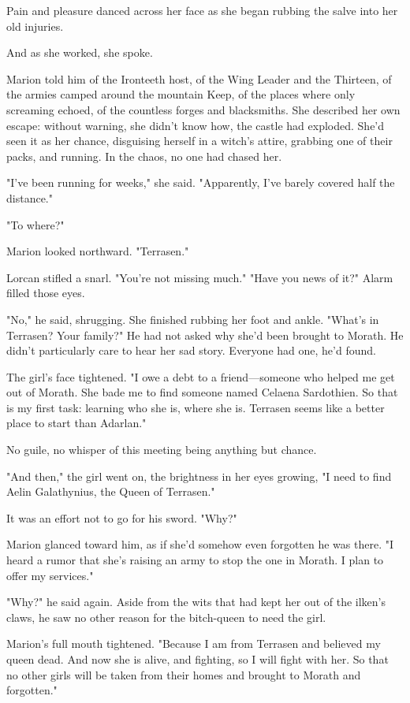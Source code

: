 Pain and pleasure danced across her face as she began rubbing the salve into her old injuries.

And as she worked, she spoke.

Marion told him of the Ironteeth host, of the Wing Leader and the Thirteen, of the armies camped around the mountain Keep, of the places where only screaming echoed, of the countless forges and blacksmiths. She described her own escape: without warning, she didn't know how, the castle had exploded. She'd seen it as her chance, disguising herself in a witch's attire, grabbing one of their packs, and running. In the chaos, no one had chased her.

"I've been running for weeks," she said. "Apparently, I've barely covered half the distance."

"To where?"

Marion looked northward. "Terrasen."

Lorcan stifled a snarl. "You're not missing much." "Have you news of it?" Alarm filled those eyes.

"No," he said, shrugging. She finished rubbing her foot and ankle. "What's in Terrasen? Your family?" He had not asked why she'd been brought to Morath. He didn't particularly care to hear her sad story. Everyone had one, he'd found.

The girl's face tightened. "I owe a debt to a friend---someone who helped me get out of Morath. She bade me to find someone named Celaena Sardothien. So that is my first task: learning who she is, where she is. Terrasen seems like a better place to start than Adarlan."

No guile, no whisper of this meeting being anything but chance.

"And then," the girl went on, the brightness in her eyes growing, "I need to find Aelin Galathynius, the Queen of Terrasen."

It was an effort not to go for his sword. "Why?"

Marion glanced toward him, as if she'd somehow even forgotten he was there. "I heard a rumor that she's raising an army to stop the one in Morath. I plan to offer my services."

"Why?" he said again. Aside from the wits that had kept her out of the ilken's claws, he saw no other reason for the bitch-queen to need the girl.

Marion's full mouth tightened. "Because I am from Terrasen and believed my queen dead. And now she is alive, and fighting, so I will fight with her. So that no other girls will be taken from their homes and brought to Morath and forgotten."

